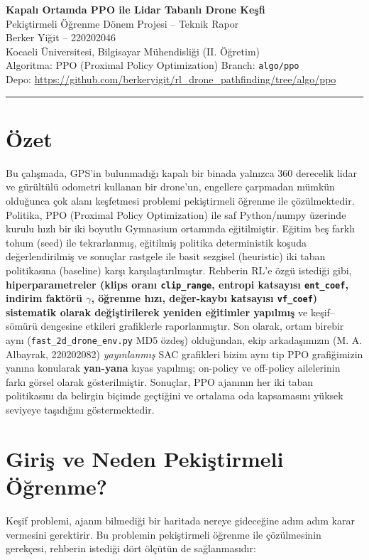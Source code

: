 \documentclass[11pt,a4paper]{article}
\newcommand{\reff}[1]{\texttt{#1}}
\begin{document}
\begin{center}
{\Large\bfseries Kapalı Ortamda PPO ile Lidar Tabanlı Drone Keşfi}\\[0.3em]
{\large Pekiştirmeli Öğrenme Dönem Projesi -- Teknik Rapor}\\[0.8em]
{\normalsize Berker Yiğit -- 220202046}\\
{\small Kocaeli Üniversitesi, Bilgisayar Mühendisliği (II. Öğretim)}\\[0.4em]
{\small Algoritma: PPO (Proximal Policy Optimization) \quad\textbar\quad Branch: \texttt{algo/ppo}}\\
{\small Depo: \url{https://github.com/berkeryigit/rl_drone_pathfinding/tree/algo/ppo}}
\end{center}

\hrule
\vspace{0.6em}

\section{Özet}
Bu çalışmada, GPS'in bulunmadığı kapalı bir binada yalnızca 360 derecelik lidar ve
gürültülü odometri kullanan bir drone'un, engellere çarpmadan mümkün olduğunca çok
alanı keşfetmesi problemi pekiştirmeli öğrenme ile çözülmektedir. Politika, PPO
(Proximal Policy Optimization) ile saf Python/numpy üzerinde kurulu hızlı bir iki
boyutlu Gymnasium ortamında eğitilmiştir. Eğitim beş farklı tohum (seed) ile
tekrarlanmış, eğitilmiş politika deterministik koşuda değerlendirilmiş ve sonuçlar
rastgele ile basit sezgisel (heuristic) iki taban politikasına (baseline) karşı
karşılaştırılmıştır. Rehberin RL'e özgü istediği gibi, \textbf{hiperparametreler
(klips oranı \reff{clip\_range}, entropi katsayısı \reff{ent\_coef}, indirim faktörü
$\gamma$, öğrenme hızı, değer-kaybı katsayısı \reff{vf\_coef}) sistematik olarak
değiştirilerek yeniden eğitimler yapılmış} ve keşif--sömürü dengesine etkileri
grafiklerle raporlanmıştır. Son olarak, ortam birebir aynı (\reff{fast\_2d\_drone\_env.py} MD5 özdeş)
olduğundan, ekip arkadaşımızın (M. A. Albayrak, 220202082) \emph{yayınlanmış} SAC
grafikleri bizim aynı tip PPO grafiğimizin yanına konularak \textbf{yan-yana} kıyas
yapılmış; on-policy ve off-policy ailelerinin farkı görsel olarak gösterilmiştir. Sonuçlar, PPO ajanının her iki taban politikasını da
belirgin biçimde geçtiğini ve ortalama oda kapsamasını yüksek seviyeye taşıdığını
göstermektedir.

\section{Giriş ve Neden Pekiştirmeli Öğrenme?}
Keşif problemi, ajanın bilmediği bir haritada nereye gideceğine adım adım karar
vermesini gerektirir. Bu problemin pekiştirmeli öğrenme ile çözülmesinin gerekçesi,
rehberin istediği dört ölçütün de sağlanmasıdır:
\end{document}
